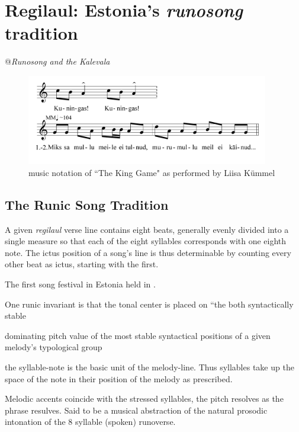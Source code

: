 \chapter{Regilaul: Estonia's {\it runosong} tradition}
@\emph{Runosong and the Kalevala}



\begin{figure}[htbp]
\begin{center}
\includegraphics[width=300pt]{figures/094.png}
\caption{music notation of ``The King Game" as performed by Liisa Kümmel}
\label{The King Game}
\end{center}
\end{figure}

\section{The Runic Song Tradition} 


A given {\it regilaul} verse line contains eight beats, generally evenly divided into a single measure so that each of the eight syllables corresponds with one eighth note. The ictus position of a song's line is thus determinable by counting every other beat as ictus, starting with the first.

The first song festival in Estonia held in \cite{ruutelTRADITIONALMUSICESTONIA2004}. 


One runic invariant is that the tonal center is placed on ``the both syntactically stable 


dominating pitch value of the most stable syntactical positions of a given melody's typological group


the syllable-note is the basic unit of the melody-line. Thus syllables take up the space of the note in their position of the melody as prescribed. 


Melodic accents coincide with the stressed syllables, the pitch resolves as the phrase resulves. Said to be a musical abstraction of the natural prosodic intonation of the 8 syllable (spoken) runoverse. 
\cite{ruutelResultsComputerizedComparative1999} 

